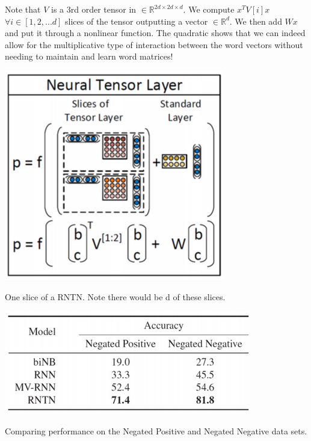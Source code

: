 \documentclass{tufte-handout}
\begin{document}
Note that $V$ is a 3rd order tensor in $\in \mathbb{R}^{2d \times 2d \times d}$.  We compute $ x^T V[i] x $  $\forall i \in [1, 2, ... d]$ slices of the tensor outputting a vector $\in \mathbb{R}^{d}$. We then add $Wx$ and put it through a nonlinear function. The quadratic shows that we can indeed allow for the multiplicative type of interaction between the word vectors without needing to maintain and learn word matrices! 


\begin{marginfigure}%
  \includegraphics[width=\linewidth]{img10}
  \caption{One slice of a RNTN. Note there would be d of these slices.}
  \label{fig:img10}
\end{marginfigure}


\begin{marginfigure}%
  \includegraphics[width=\linewidth]{img11}
  \caption{Comparing performance on the Negated Positive and Negated Negative data sets.}
  \label{fig:img11}
\end{marginfigure}
\end{document}

